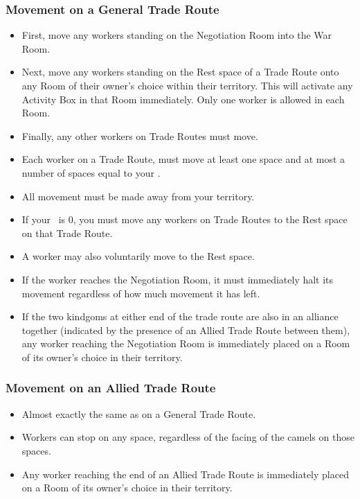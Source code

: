 \documentclass[10pt,twocolumn]{article}
\begin{document}
\subsubsection{Movement on a General Trade Route}
\begin{itemize}
\item First, move any workers standing on the Negotiation Room into the War Room.
\item Next, move any workers standing on the Rest space of a Trade Route onto any Room of their owner's choice within their territory. This will activate any Activity Box in that Room immediately. Only one worker is allowed in each Room.
\item Finally, any other workers on Trade Routes must move.
\item Each worker on a Trade Route, must move at least one space and at most a number of spaces equal to your \tra.
\item All movement must be made away from your territory.
\item If your \tra\ is 0, you must move any workers on Trade Routes to the Rest space on that Trade Route.
\item A worker may also voluntarily move to the Rest space.
\item If the worker reaches the Negotiation Room, it must immediately halt its movement regardless of how much movement it has left.
\item If the two kindgoms at either end of the trade route are also in an alliance together (indicated by the presence of an Allied Trade Route between them), any worker reaching the Negotiation Room is immediately placed on a Room of its owner's choice in their territory.
\end{itemize}

\subsubsection{Movement on an Allied Trade Route}
\begin{itemize}
\item Almost exactly the same as on a General Trade Route.
\item Workers can stop on any space, regardless of the facing of the camels on those spaces.
\item Any worker reaching the end of an Allied Trade Route is immediately placed on a Room of its owner's choice in their territory.
\end{itemize}
\end{document}
